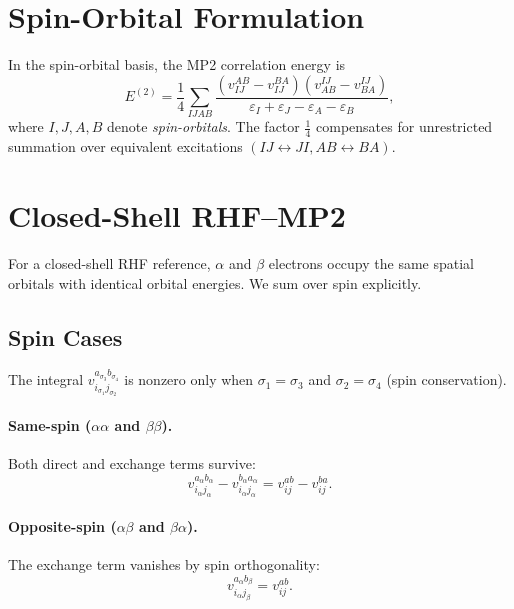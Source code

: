 \documentclass[a4paper,12pt,oneside]{book}
\begin{document}
\section{Spin-Orbital Formulation}
\label{sec:spin-orbital-mp2}

In the spin-orbital basis, the MP2 correlation energy is
\begin{equation}
\label{eq:spin-orbital-mp2}
E^{(2)} = \frac{1}{4} \sum_{IJAB} \frac{(v_{IJ}^{AB} - v_{IJ}^{BA})(v^{IJ}_{AB} - v^{IJ}_{BA})}
{\varepsilon_I + \varepsilon_J - \varepsilon_A - \varepsilon_B},
\end{equation}
where $I,J,A,B$ denote \emph{spin-orbitals}.
The factor $\tfrac{1}{4}$ compensates for unrestricted summation over equivalent 
excitations $(IJ \leftrightarrow JI, AB \leftrightarrow BA)$.


\section{Closed-Shell RHF--MP2}
\label{sec:rhf-mp2}

For a closed-shell RHF reference, $\alpha$ and $\beta$ electrons occupy 
the same spatial orbitals with identical orbital energies. We sum over 
spin explicitly.

\subsection{Spin Cases}
The integral $v_{i_{\sigma_1} j_{\sigma_2}}^{a_{\sigma_3} b_{\sigma_4}}$
is nonzero only when $\sigma_1 = \sigma_3$ and $\sigma_2 = \sigma_4$ (spin conservation).

\paragraph{Same-spin ($\alpha\alpha$ and $\beta\beta$).}
Both direct and exchange terms survive:
\begin{equation}
v_{i_\alpha j_\alpha}^{a_\alpha b_\alpha} - v_{i_\alpha j_\alpha}^{b_\alpha a_\alpha} 
= v_{ij}^{ab} - v_{ij}^{ba}.
\end{equation}

\paragraph{Opposite-spin ($\alpha\beta$ and $\beta\alpha$).}
The exchange term vanishes by spin orthogonality:
\begin{equation}
v_{i_\alpha j_\beta}^{a_\alpha b_\beta} = v_{ij}^{ab}.
\end{equation}
\end{document}
